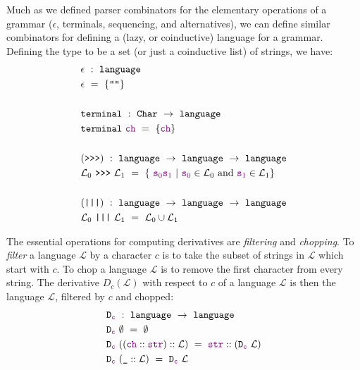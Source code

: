     Much as we defined parser combinators for the elementary operations of a grammar ($\epsilon$, terminals, sequencing, and alternatives), we can define similar combinators for defining a (lazy, or coinductive) language for a grammar.  Defining the type  to be a set (or just a coinductive list) of strings, we have:
\begin{align*}
& \epsilon~:~\fname{language} \\
& \epsilon~=~\{\str{}\} \\ \\
& \fname{terminal}~:~\indname{Char}~\to~\fname{language} \\
& \fname{terminal}~\farg{ch}~=~\{\farg{ch}\} \\ \\
& (\fname{\sequencing})~:~\fname{language}~\to~\fname{language}~\to~\fname{language} \\
& \mathcal{L}_0~\fname{\sequencing}~\mathcal{L}_1~=~\{~\strcat{\farg{s\ensuremath{_0}}}{\farg{s\ensuremath{_1}}}~|~\farg{s\ensuremath{_0}}\in\mathcal L_0\text{ and }\farg{s\ensuremath{_1}}\in\mathcal{L}_1 \} \\ \\
& (\fname{|||})~:~\fname{language}~\to~\fname{language}~\to~\fname{language} \\
& \mathcal{L}_0~\fname{|||}~\mathcal{L}_1~=~\mathcal L_0\cup\mathcal L_1
\end{align*}

    The essential operations for computing derivatives are \emph{filtering} and \emph{chopping}.  To \emph{filter} a language $\mathcal L$ by a character $c$ is to take the subset of strings in $\mathcal L$ which start with $c$.  To chop a language $\mathcal L$ is to remove the first character from every string.  The derivative $D_c(\mathcal L)$ with respect to $c$ of a language $\mathcal L$ is then the language $\mathcal L$, filtered by $c$ and chopped:
\begin{align*}
&\texttt{D}_{\textcolor{violet}{\texttt{c}}}~:~\texttt{language}~\to~\texttt{language} \\
&\texttt{D}_{\textcolor{violet}{\texttt{c}}}~\emptyset~=~\emptyset \\
&\texttt{D}_{\textcolor{violet}{\texttt{c}}}~((\textcolor{violet}{\texttt{ch}}::\textcolor{violet}{\texttt{str}})::\mathcal L)~=~\textcolor{violet}{\texttt{str}}::(\texttt{D}_{\textcolor{violet}{\texttt{c}}}~\mathcal{L}) \\
&\texttt{D}_{\textcolor{violet}{\texttt{c}}}~(\texttt{\_}::\mathcal L)~=~\texttt{D}_{\textcolor{violet}{\texttt{c}}}~\mathcal{L}
\end{align*}


